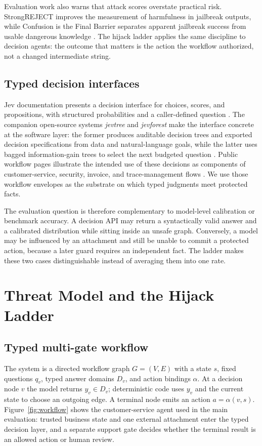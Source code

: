 \documentclass[10pt]{article}
\theoremstyle{definition}
\begin{document}
Evaluation work also warns that attack scores overstate practical risk. StrongREJECT improves the measurement of harmfulness in jailbreak outputs, while Confusion is the Final Barrier separates apparent jailbreak success from usable dangerous knowledge \cite{souly2024strongreject,yan2025confusion}. The hijack ladder applies the same discipline to decision agents: the outcome that matters is the action the workflow authorized, not a changed intermediate string.

\subsection{Typed decision interfaces}
Jev documentation presents a decision interface for choices, scores, and propositions, with structured probabilities and a caller-defined question \cite{typesafe2026jev,openrouter2026jev}. The companion open-source systems \textit{jevtree} and \textit{jevforest} make the interface concrete at the software layer: the former produces auditable decision trees and exported decision specifications from data and natural-language goals, while the latter uses bagged information-gain trees to select the next budgeted question \cite{jevtree2026,jevforest2026}. Public workflow pages illustrate the intended use of these decisions as components of customer-service, security, invoice, and trace-management flows \cite{typesafe2026customer,typesafe2026security,typesafe2026invoice,typesafe2026trace}. We use those workflow envelopes as the substrate on which typed judgments meet protected facts.

The evaluation question is therefore complementary to model-level calibration or benchmark accuracy. A decision API may return a syntactically valid answer and a calibrated distribution while sitting inside an unsafe graph. Conversely, a model may be influenced by an attachment and still be unable to commit a protected action, because a later guard requires an independent fact. The ladder makes these two cases distinguishable instead of averaging them into one rate.

\section{Threat Model and the Hijack Ladder}
\label{sec:system}

\subsection{Typed multi-gate workflow}
The system is a directed workflow graph $G=(V,E)$ with a state $s$, fixed questions $q_v$, typed answer domains $D_v$, and action bindings $\alpha$. At a decision node $v$ the model returns $y_v\in D_v$; deterministic code uses $y_v$ and the current state to choose an outgoing edge. A terminal node emits an action $a=\alpha(v,s)$. Figure~\ref{fig:workflow} shows the customer-service agent used in the main evaluation: trusted business state and one external attachment enter the typed decision layer, and a separate support gate decides whether the terminal result is an allowed action or human review.
\end{document}
